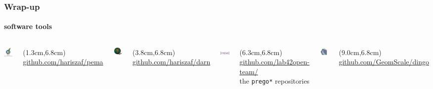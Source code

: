 \documentclass{beamer}
\begin{document}
\begin{frame}
   \frametitle{Wrap-up}
   \framesubtitle{software tools}

   \begin{columns}[onlytextwidth]


         \includegraphics[width=25mm]{resources/pema_logo.png}

         \begin{textblock*}{3cm}(1.3cm,6.8cm)
            \tiny \href{https://github.com/hariszaf/pema}{github.com/hariszaf/pema}
         \end{textblock*}


         \includegraphics[width=25mm]{resources/darn_logo.png}
         \begin{textblock*}{3cm}(3.8cm,6.8cm)
            \tiny	 \href{https://github.com/hariszaf/darn}{github.com/hariszaf/darn}
         \end{textblock*}


         \includegraphics[width=25mm]{resources/prego_logo.png}
         \begin{textblock*}{3cm}(6.3cm,6.8cm)
            \tiny	 \href{https://github.com/lab42open-team}{github.com/lab42open-team/} \\
            \tiny the \texttt{prego*} repositories
         \end{textblock*}


         \includegraphics[width=25mm]{../met_nets/resources/dingo5_transparent.png}
         \begin{textblock*}{3cm}(9.0cm,6.8cm)
            \tiny	 \href{https://github.com/GeomScale/dingo}{github.com/GeomScale/dingo}
         \end{textblock*}

   \end{columns}
\end{frame}
\end{document}
